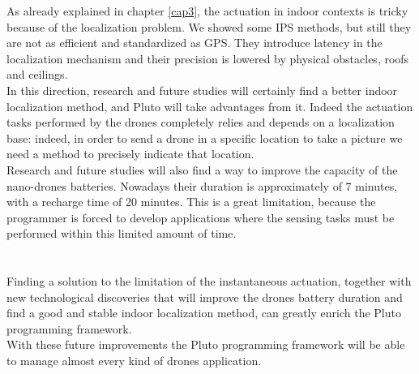 As already explained in chapter \ref{cap3}, the actuation in indoor contexts is tricky because of the localization problem.
We showed some IPS methods, but still they are not as efficient and standardized as GPS.
They introduce latency in the localization mechanism and their precision is lowered by physical obstacles, roofs and ceilings.
\\

In this direction, research and future studies will certainly find a better indoor localization method, and Pluto will take advantages from it.
Indeed the actuation tasks performed by the drones completely relies and depends on a localization base: indeed, in order to send a drone in a specific location to take a picture we need a method to precisely indicate that location.
\\

Research and future studies will also find a way to improve the capacity of the nano-drones batteries. 
Nowadays their duration is approximately of 7 minutes, with a recharge time of 20 minutes.
This is a great limitation, because the programmer is forced to develop applications where the sensing tasks must be performed within this limited amount of time.
\\
\\
\\

Finding a solution to the limitation of the instantaneous actuation, together with new technological discoveries that will improve the drones battery duration and find a good and stable indoor localization method, can greatly enrich the Pluto programming framework.
\\

With these future improvements the Pluto programming framework will be able to manage almost every kind of drones application.







